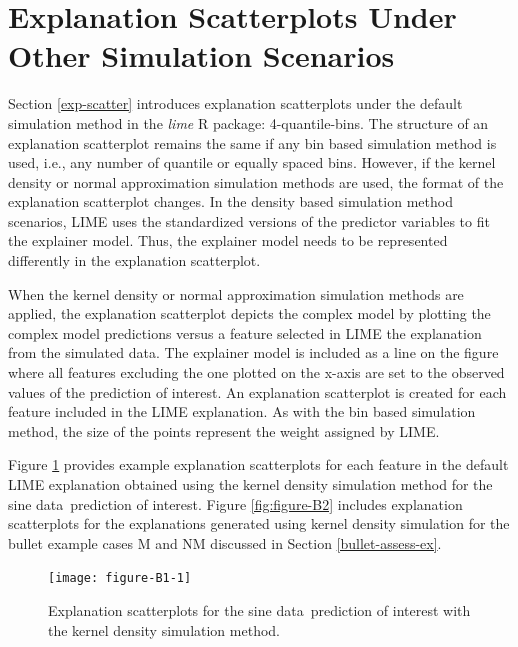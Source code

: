 \documentclass[AMS,STIX2COL]{WileyNJD-v2}\usepackage[]{graphicx}\usepackage[]{color}
\newenvironment{knitrout}{}{} %
\newcommand{\data}{sine data}
\begin{document}
\section{Explanation Scatterplots Under Other Simulation Scenarios} \label{exp-scatter_plus}

Section \ref{exp-scatter} introduces explanation scatterplots under the default simulation method in the \emph{lime} R package: 4-quantile-bins. The structure of an explanation scatterplot remains the same if any bin based simulation method is used, i.e., any number of quantile or equally spaced bins. However, if the kernel density or normal approximation simulation methods are used, the format of the explanation scatterplot changes. In the density based simulation method scenarios, LIME uses the standardized versions of the predictor variables to fit the explainer model. Thus, the explainer model needs to be represented differently in the explanation scatterplot.

When the kernel density or normal approximation simulation methods are applied, the explanation scatterplot depicts the complex model by plotting the complex model predictions versus a feature selected in LIME the explanation from the simulated data. The explainer model is included as a line on the figure where all features excluding the one plotted on the x-axis are set to the observed values of the prediction of interest. An explanation scatterplot is created for each feature included in the LIME explanation. As with the bin based simulation method, the size of the points represent the weight assigned by LIME.

Figure \ref{fig:figure-B1} provides example explanation scatterplots for each feature in the default LIME explanation obtained using the kernel density simulation method for the \data \ prediction of interest. Figure \ref{fig:figure-B2} includes explanation scatterplots for the explanations generated using kernel density simulation for the bullet example cases M and NM discussed in Section \ref{bullet-assess-ex}.

\begin{figure}[!thp]
\begin{knitrout}
\color{fgcolor}

{\centering \texttt{[image: figure-B1-1]} 

}



\end{knitrout}
\caption{Explanation scatterplots for the \data \ prediction of interest with the kernel density simulation method.}
\label{fig:figure-B1}
\end{figure}
\end{document}
